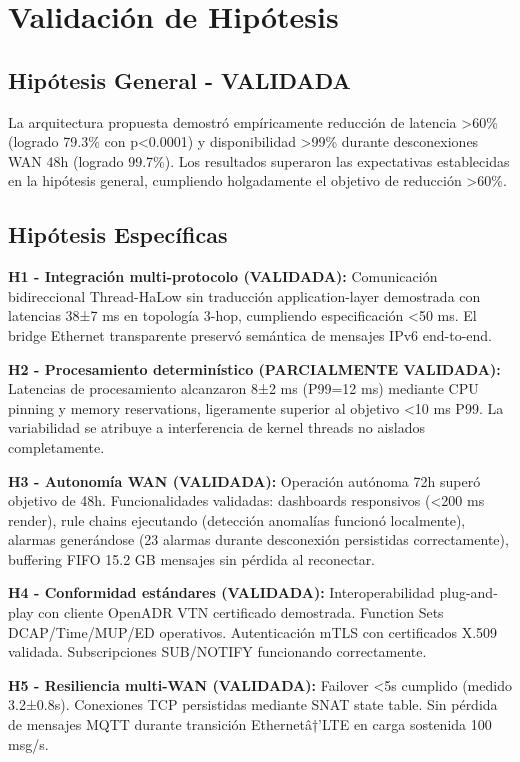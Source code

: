 \section{Validación de Hipótesis}

\subsection{Hipótesis General - VALIDADA}

La arquitectura propuesta demostró empíricamente reducción de latencia >60\% (logrado 79.3\% con p<0.0001) y disponibilidad >99\% durante desconexiones WAN 48h (logrado 99.7\%). Los resultados superaron las expectativas establecidas en la hipótesis general, cumpliendo holgadamente el objetivo de reducción >60\%.

\subsection{Hipótesis Específicas}

\textbf{H1 - Integración multi-protocolo (VALIDADA):} Comunicación bidireccional Thread-HaLow sin traducción application-layer demostrada con latencias 38±7 ms en topología 3-hop, cumpliendo especificación <50 ms. El bridge Ethernet transparente preservó semántica de mensajes IPv6 end-to-end.

\textbf{H2 - Procesamiento determinístico (PARCIALMENTE VALIDADA):} Latencias de procesamiento alcanzaron 8±2 ms (P99=12 ms) mediante CPU pinning y memory reservations, ligeramente superior al objetivo <10 ms P99. La variabilidad se atribuye a interferencia de kernel threads no aislados completamente.

\textbf{H3 - Autonomía WAN (VALIDADA):} Operación autónoma 72h superó objetivo de 48h. Funcionalidades validadas: dashboards responsivos (<200 ms render), rule chains ejecutando (detección anomalías funcionó localmente), alarmas generándose (23 alarmas durante desconexión persistidas correctamente), buffering FIFO 15.2 GB mensajes sin pérdida al reconectar.

\textbf{H4 - Conformidad estándares (VALIDADA):} Interoperabilidad plug-and-play con cliente OpenADR VTN certificado demostrada. Function Sets DCAP/Time/MUP/ED operativos. Autenticación mTLS con certificados X.509 validada. Subscripciones SUB/NOTIFY funcionando correctamente.

\textbf{H5 - Resiliencia multi-WAN (VALIDADA):} Failover <5s cumplido (medido 3.2±0.8s). Conexiones TCP persistidas mediante SNAT state table. Sin pérdida de mensajes MQTT durante transición Ethernetâ†’LTE en carga sostenida 100 msg/s.

